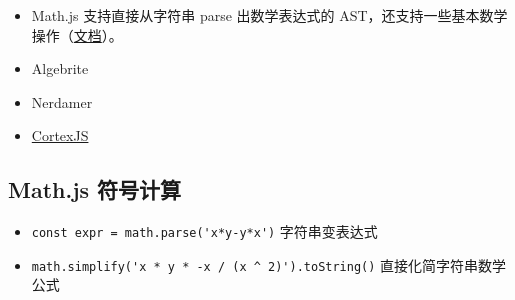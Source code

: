 
\begin{issues}
\issueDraft
\end{issues}

\begin{itemize}
\item Math.js 支持直接从字符串 parse 出数学表达式的 AST，还支持一些基本数学操作（\href{https://mathjs.org/docs/expressions/algebra.html}{文档}）。
\item Algebrite
\item Nerdamer
\item \href{https://cortexjs.io/}{CortexJS}
\end{itemize}

\subsection{Math.js 符号计算}
\begin{itemize}
\item \verb`const expr = math.parse('x*y-y*x')` 字符串变表达式
\item \verb`math.simplify('x * y * -x / (x ^ 2)').toString()` 直接化简字符串数学公式
\end{itemize}
